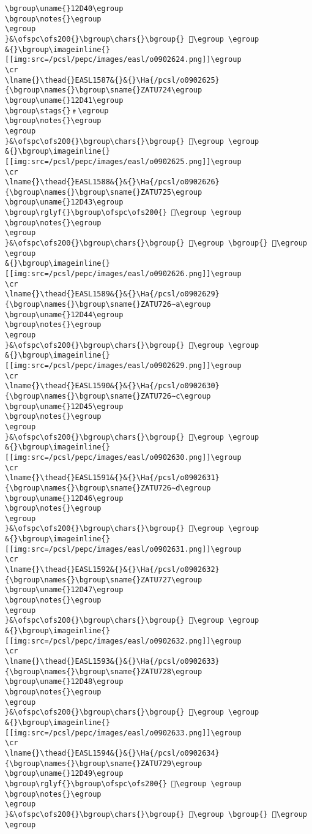 \begin{verbatim}
\bgroup\uname{}12D40\egroup
\bgroup\notes{}\egroup
\egroup
}&\ofspc\ofs200{}\bgroup\chars{}\bgroup{} 𒵀\egroup \egroup
&{}\bgroup\imageinline{}[[img:src=/pcsl/pepc/images/easl/o0902624.png]]\egroup
\cr
\lname{}\thead{}EASL1587&{}&{}\Ha{/pcsl/o0902625}{\bgroup\names{}\bgroup\sname{}ZATU724\egroup
\bgroup\uname{}12D41\egroup
\bgroup\stags{}﹟\egroup
\bgroup\notes{}\egroup
\egroup
}&\ofspc\ofs200{}\bgroup\chars{}\bgroup{} 𒵁\egroup \egroup
&{}\bgroup\imageinline{}[[img:src=/pcsl/pepc/images/easl/o0902625.png]]\egroup
\cr
\lname{}\thead{}EASL1588&{}&{}\Ha{/pcsl/o0902626}{\bgroup\names{}\bgroup\sname{}ZATU725\egroup
\bgroup\uname{}12D43\egroup
\bgroup\rglyf{}\bgroup\ofspc\ofs200{} 𒵃\egroup \egroup
\bgroup\notes{}\egroup
\egroup
}&\ofspc\ofs200{}\bgroup\chars{}\bgroup{} 𒵂\egroup \bgroup{} 𒵃\egroup \egroup
&{}\bgroup\imageinline{}[[img:src=/pcsl/pepc/images/easl/o0902626.png]]\egroup
\cr
\lname{}\thead{}EASL1589&{}&{}\Ha{/pcsl/o0902629}{\bgroup\names{}\bgroup\sname{}ZATU726∼a\egroup
\bgroup\uname{}12D44\egroup
\bgroup\notes{}\egroup
\egroup
}&\ofspc\ofs200{}\bgroup\chars{}\bgroup{} 𒵄\egroup \egroup
&{}\bgroup\imageinline{}[[img:src=/pcsl/pepc/images/easl/o0902629.png]]\egroup
\cr
\lname{}\thead{}EASL1590&{}&{}\Ha{/pcsl/o0902630}{\bgroup\names{}\bgroup\sname{}ZATU726∼c\egroup
\bgroup\uname{}12D45\egroup
\bgroup\notes{}\egroup
\egroup
}&\ofspc\ofs200{}\bgroup\chars{}\bgroup{} 𒵅\egroup \egroup
&{}\bgroup\imageinline{}[[img:src=/pcsl/pepc/images/easl/o0902630.png]]\egroup
\cr
\lname{}\thead{}EASL1591&{}&{}\Ha{/pcsl/o0902631}{\bgroup\names{}\bgroup\sname{}ZATU726∼d\egroup
\bgroup\uname{}12D46\egroup
\bgroup\notes{}\egroup
\egroup
}&\ofspc\ofs200{}\bgroup\chars{}\bgroup{} 𒵆\egroup \egroup
&{}\bgroup\imageinline{}[[img:src=/pcsl/pepc/images/easl/o0902631.png]]\egroup
\cr
\lname{}\thead{}EASL1592&{}&{}\Ha{/pcsl/o0902632}{\bgroup\names{}\bgroup\sname{}ZATU727\egroup
\bgroup\uname{}12D47\egroup
\bgroup\notes{}\egroup
\egroup
}&\ofspc\ofs200{}\bgroup\chars{}\bgroup{} 𒵇\egroup \egroup
&{}\bgroup\imageinline{}[[img:src=/pcsl/pepc/images/easl/o0902632.png]]\egroup
\cr
\lname{}\thead{}EASL1593&{}&{}\Ha{/pcsl/o0902633}{\bgroup\names{}\bgroup\sname{}ZATU728\egroup
\bgroup\uname{}12D48\egroup
\bgroup\notes{}\egroup
\egroup
}&\ofspc\ofs200{}\bgroup\chars{}\bgroup{} 𒵈\egroup \egroup
&{}\bgroup\imageinline{}[[img:src=/pcsl/pepc/images/easl/o0902633.png]]\egroup
\cr
\lname{}\thead{}EASL1594&{}&{}\Ha{/pcsl/o0902634}{\bgroup\names{}\bgroup\sname{}ZATU729\egroup
\bgroup\uname{}12D49\egroup
\bgroup\rglyf{}\bgroup\ofspc\ofs200{} 𒵉\egroup \egroup
\bgroup\notes{}\egroup
\egroup
}&\ofspc\ofs200{}\bgroup\chars{}\bgroup{} 𒵉\egroup \bgroup{} 𒵊\egroup \egroup

\end{verbatim}

